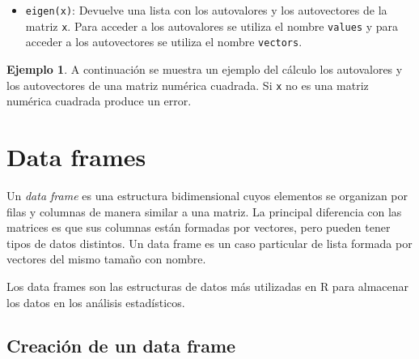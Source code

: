 \documentclass[
]{book}
\newenvironment{Shaded}{\begin{snugshade}}{\end{snugshade}}
\newcommand{\AttributeTok}[1]{\textcolor[rgb]{0.77,0.63,0.00}{#1}}
\newcommand{\CommentTok}[1]{\textcolor[rgb]{0.56,0.35,0.01}{\textit{#1}}}
\newcommand{\DecValTok}[1]{\textcolor[rgb]{0.00,0.00,0.81}{#1}}
\newcommand{\FunctionTok}[1]{\textcolor[rgb]{0.00,0.00,0.00}{#1}}
\newcommand{\NormalTok}[1]{#1}
\newcommand{\OtherTok}[1]{\textcolor[rgb]{0.56,0.35,0.01}{#1}}
\newcommand{\SpecialCharTok}[1]{\textcolor[rgb]{0.00,0.00,0.00}{#1}}
\providecommand{\tightlist}{%
  \setlength{\itemsep}{0pt}\setlength{\parskip}{0pt}}
\theoremstyle{definition}
\theoremstyle{definition}
\newtheorem{example}{Ejemplo}[chapter]
\theoremstyle{definition}
\theoremstyle{definition}
\theoremstyle{remark}
\begin{document}
\begin{itemize}
\tightlist
\item
  \texttt{eigen(x)}: Devuelve una lista con los autovalores y los autovectores de la matriz \texttt{x}. Para acceder a los autovalores se utiliza el nombre \texttt{values} y para acceder a los autovectores se utiliza el nombre \texttt{vectors}.
\end{itemize}

\begin{example}

A continuación se muestra un ejemplo del cálculo los autovalores y los autovectores de una matriz numérica cuadrada. Si \texttt{x} no es una matriz numérica cuadrada produce un error.

\begin{Shaded}
\end{Shaded}

\end{example}

\hypertarget{data-frames}{%
\section{Data frames}\label{data-frames}}

Un \emph{data frame} es una estructura bidimensional cuyos elementos se organizan por filas y columnas de manera similar a una matriz. La principal diferencia con las matrices es que sus columnas están formadas por vectores, pero pueden tener tipos de datos distintos. Un data frame es un caso particular de lista formada por vectores del mismo tamaño con nombre.

Los data frames son las estructuras de datos más utilizadas en R para almacenar los datos en los análisis estadísticos.

\hypertarget{creaciuxf3n-de-un-data-frame}{%
\subsection{Creación de un data frame}\label{creaciuxf3n-de-un-data-frame}}
\end{document}
